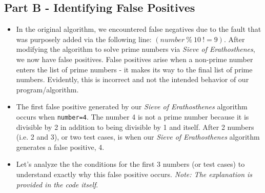 \documentclass{article}
\begin{document}
\subsection*{Part B - Identifying False Positives}

\smallskip

\begin{itemize}
    \item In the original algorithm, we encountered false negatives due to the fault that was purposely added via the following line: $(number \ \% \ 10 \ != 9)$. After modifying the algorithm to solve prime numbers via \textit{Sieve of Erathosthenes}, we now have false positives. False positives arise when a non-prime number enters the list of prime numbers - it makes its way to the final list of prime numbers. Evidently, this is incorrect and not the intended behavior of our program/algorithm.
    \item The first false positive generated by our \textit{Sieve of Erathosthenes} algorithm occurs when \texttt{number=4}. The number 4 is not a prime number because it is divisible by 2 in addition to being divisible by 1 and itself. After 2 numbers (i.e. 2 and 3), or two test cases, is when our \textit{Sieve of Erathosthenes} algorithm generates a false positive, 4.
    \item Let's analyze the the conditions for the first 3 numbers (or test cases) to understand exactly why this false positive occurs. \textit{Note: The explanation is provided in the code itself}.

\end{itemize}
\end{document}
